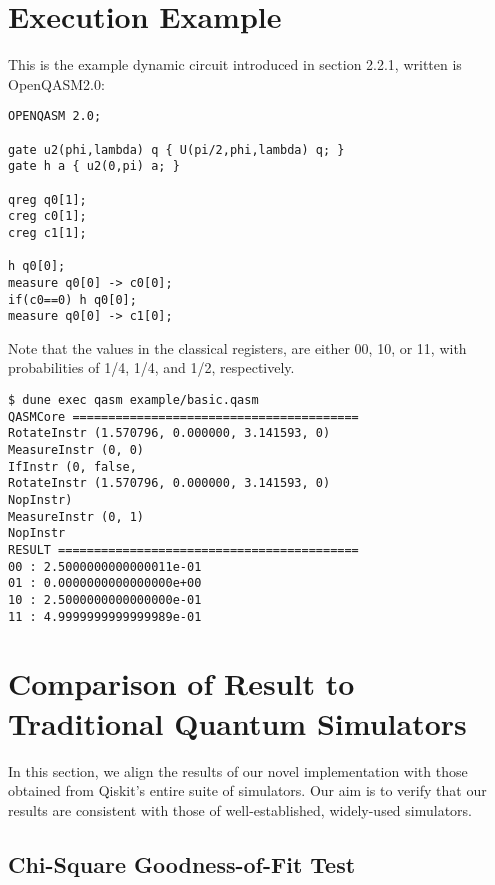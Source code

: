 \documentclass[10pt,a4paper]{article}
\newcommand{\<}{\langle}
\renewcommand{\>}{\rangle}
\begin{document}
\section{Execution Example}

This is the example dynamic circuit introduced in section 2.2.1, written is OpenQASM2.0:\\
\begin{lstlisting}
OPENQASM 2.0;

gate u2(phi,lambda) q { U(pi/2,phi,lambda) q; }
gate h a { u2(0,pi) a; }

qreg q0[1];
creg c0[1];
creg c1[1];

h q0[0];
measure q0[0] -> c0[0];
if(c0==0) h q0[0];
measure q0[0] -> c1[0];
\end{lstlisting}

Note that the values in the classical registers, are either 00, 10, or 11, with probabilities of
1/4, 1/4, and 1/2, respectively.
\\

\begin{lstlisting}
$ dune exec qasm example/basic.qasm
QASMCore ========================================
RotateInstr (1.570796, 0.000000, 3.141593, 0)
MeasureInstr (0, 0)
IfInstr (0, false,
RotateInstr (1.570796, 0.000000, 3.141593, 0)
NopInstr)
MeasureInstr (0, 1)
NopInstr
RESULT ==========================================
00 : 2.5000000000000011e-01
01 : 0.0000000000000000e+00
10 : 2.5000000000000000e-01
11 : 4.9999999999999989e-01
\end{lstlisting}



\section{Comparison of Result to Traditional Quantum Simulators}

In this section, we align the results of our novel implementation with those obtained from Qiskit's
entire suite of simulators. Our aim is to verify that our results are consistent with those of
well-established, widely-used simulators.

\subsection{Chi-Square Goodness-of-Fit Test}
\end{document}

